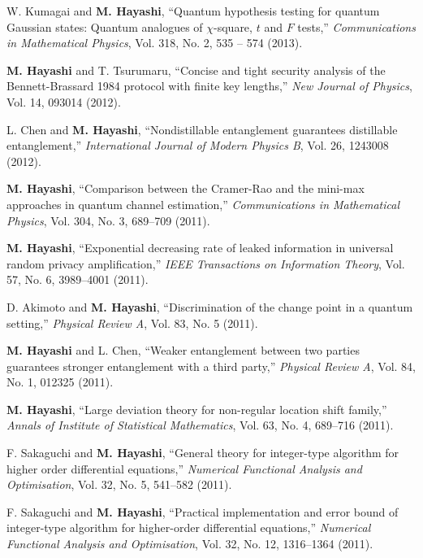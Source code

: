 \documentclass[a4paper,12pt,oneside]{article}
\begin{document}
\begin{enumerate}
W. Kumagai and \textbf{M. Hayashi}, 
``Quantum hypothesis testing for quantum Gaussian states: Quantum analogues of $\chi$-square, $t$ and $F$ tests,''  {\em Communications in Mathematical Physics}, Vol. 318, No. 2, 535 -- 574 (2013). 

\textbf{M. Hayashi} and T. Tsurumaru, 
``Concise and tight security analysis of the Bennett-Brassard 1984 protocol with finite key lengths,'' 
{\em New Journal of Physics}, Vol. 14, 093014 (2012).

L. Chen and \textbf{M. Hayashi}, 
``Nondistillable entanglement guarantees distillable entanglement,''
{\em International Journal of Modern Physics B}, Vol. 26, 1243008 (2012).

\textbf{M. Hayashi}, 
``Comparison between the Cramer-Rao and the mini-max approaches in quantum channel estimation,'' 
{\em Communications in Mathematical Physics}, Vol. 304, No. 3, 689--709 (2011).

	\textbf{M. Hayashi}, 
``Exponential decreasing rate of leaked information in universal random privacy amplification,'' 
{\em IEEE Transactions on Information Theory}, Vol. 57, No. 6, 3989--4001 (2011).

	D. Akimoto and \textbf{M. Hayashi}, 
``Discrimination of the change point in a quantum setting,''
{\em Physical Review A}, Vol. 83, No. 5 (2011).

	\textbf{M. Hayashi} and L. Chen, 
``Weaker entanglement between two parties guarantees stronger entanglement with a third party,'' 
{\em Physical Review A}, Vol. 84, No. 1, 012325 (2011). 

	\textbf{M. Hayashi}, 
``Large deviation theory for non-regular location shift family,''
{\em Annals of Institute of Statistical Mathematics}, Vol. 63, No. 4, 689--716 (2011).

	F. Sakaguchi and \textbf{M. Hayashi}, 
``General theory for integer-type algorithm for higher order differential equations,'' 
{\em Numerical Functional Analysis and Optimisation}, 
Vol. 32, No. 5, 541--582 (2011).

F. Sakaguchi and \textbf{M. Hayashi}, 
``Practical implementation and error bound of integer-type algorithm for higher-order differential equations,'' 
{\em Numerical Functional Analysis and Optimisation}, 
Vol. 32, No. 12, 1316--1364 (2011). 


\end{enumerate}
\end{document}
